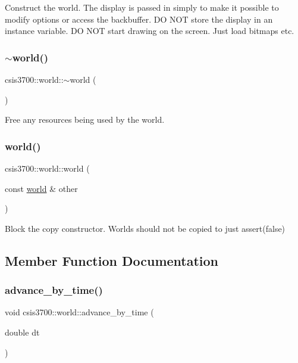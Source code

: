 Construct the world. The display is passed in simply to make it possible to modify options or access the backbuffer. DO N\+OT store the display in an instance variable. DO N\+OT start drawing on the screen. Just load bitmaps etc. \mbox{\label{classcsis3700_1_1world_ae793effd77990768c2f7565cb2daba70}} 
\subsubsection{\texorpdfstring{$\sim$world()}{~world()}}
{\footnotesize\ttfamily csis3700\+::world\+::$\sim$world (\begin{DoxyParamCaption}{ }\end{DoxyParamCaption})}

Free any resources being used by the world. \mbox{\label{classcsis3700_1_1world_a323fcd5b15ee4a274bffe02cf9c7cd0e}} 
\subsubsection{\texorpdfstring{world()}{world()}\hspace{0.1cm}{\footnotesize\ttfamily [2/2]}}
{\footnotesize\ttfamily csis3700\+::world\+::world (\begin{DoxyParamCaption}\item[{const \hyperlink{classcsis3700_1_1world}{world} \&}]{other }\end{DoxyParamCaption})}

Block the copy constructor. Worlds should not be copied to just assert(false) 

\subsection{Member Function Documentation}
\mbox{\label{classcsis3700_1_1world_a2b4a33cc658001cde9d838ff50237a5f}} 
\subsubsection{\texorpdfstring{advance\+\_\+by\+\_\+time()}{advance\_by\_time()}}
{\footnotesize\ttfamily void csis3700\+::world\+::advance\+\_\+by\+\_\+time (\begin{DoxyParamCaption}\item[{double}]{dt }\end{DoxyParamCaption})}

